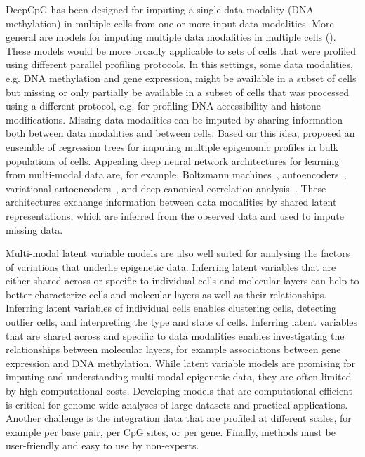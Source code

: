 DeepCpG has been designed for imputing a single data modality (DNA methylation) in multiple cells from one or more input data modalities. More general are models for imputing multiple data modalities in multiple cells (). These models would be more broadly applicable to sets of cells that were profiled using different parallel profiling protocols.  In this settings, some data modalities, e.g. DNA methylation and gene expression, might be available in a subset of cells but missing or only partially be available in a subset of cells that was processed using a different protocol, e.g. for profiling DNA accessibility and histone modifications. Missing data modalities can be imputed by sharing information both between data modalities and between cells. Based on this idea, \citet{ernst_large-scale_2015} proposed an ensemble of regression trees for imputing multiple epigenomic profiles in bulk populations of cells. Appealing deep neural network architectures for learning from multi-modal data are, for example, Boltzmann machines~\citep{srivastava_multimodal_2012}, autoencoders~\citep{chandar_correlational_2015,rajendran_bridge_2015}, variational autoencoders~\citep{pandey_variational_2016,suzuki_joint_2016,serban_multi-modal_2016}, and deep canonical correlation analysis~\citep{andrew_deep_2013,benton_deep_2017}. These architectures exchange information between data modalities by shared latent representations, which are inferred from the observed data and used to impute missing data.

Multi-modal latent variable models are also well suited for analysing the factors of variations that underlie epigenetic data. Inferring latent variables that are either shared across or specific to individual cells and molecular layers can help to better characterize cells and molecular layers as well as their relationships. Inferring latent variables of individual cells enables clustering cells, detecting outlier cells, and interpreting the type and state of cells. Inferring latent variables that are shared across and specific to data modalities enables investigating the relationships between molecular layers, for example associations between gene expression and DNA methylation. While latent variable models are promising for imputing and understanding multi-modal epigenetic data, they are often limited by high computational costs. Developing models that are computational efficient is critical for genome-wide analyses of large datasets and practical applications. Another challenge is the integration data that are profiled at different scales, for example per base pair, per CpG sites, or per gene. Finally, methods must be user-friendly and easy to use by non-experts.
